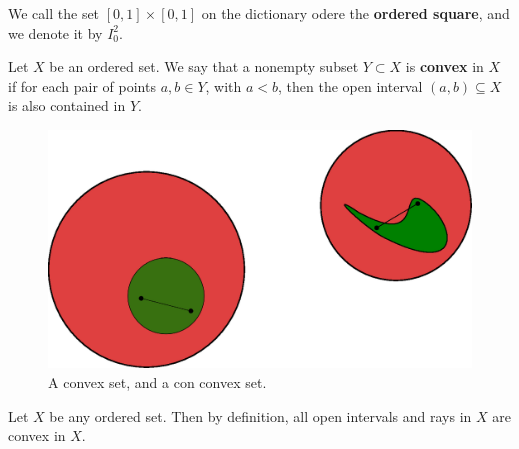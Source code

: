 \begin{definition}
    We call the set $[0,1] \times [0,1]$ on the dictionary odere the \textbf{ordered square}, and we
    denote it by $I_0^2$.
\end{definition}

\begin{definition}
    Let $X$ be an ordered set. We say that a nonempty subset $Y \subset X$ is \textbf{convex}
    in $X$ if for each pair of points  $a,b \in Y$, with  $a<b$, then the open interval  $(a,b) \subseteq X$ is
    also contained in  $Y$.
\end{definition}

\begin{figure}[h]
    \centering
    \includegraphics[scale = 0.5]{Figures/Chapter1/convex_nonconvex.eps}
    \caption{A convex set, and a con convex set.}
    \label{fig1.6}
\end{figure}

\begin{example}
    Let $X$ be any ordered set. Then by definition, all open intervals and rays in
    $X$ are convex in  $X$.
\end{example}

